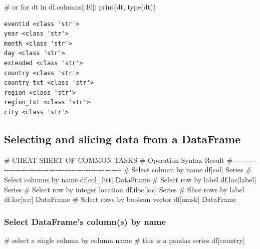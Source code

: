 \documentclass[
  letterpaper,
  DIV=11,
  numbers=noendperiod]{scrreprt}
\newenvironment{Shaded}{\begin{snugshade}}{\end{snugshade}}
\newcommand{\BuiltInTok}[1]{\textcolor[rgb]{0.00,0.23,0.31}{#1}}
\newcommand{\CommentTok}[1]{\textcolor[rgb]{0.37,0.37,0.37}{#1}}
\newcommand{\ControlFlowTok}[1]{\textcolor[rgb]{0.00,0.23,0.31}{#1}}
\newcommand{\DecValTok}[1]{\textcolor[rgb]{0.68,0.00,0.00}{#1}}
\newcommand{\KeywordTok}[1]{\textcolor[rgb]{0.00,0.23,0.31}{#1}}
\newcommand{\NormalTok}[1]{\textcolor[rgb]{0.00,0.23,0.31}{#1}}
\newcommand{\StringTok}[1]{\textcolor[rgb]{0.13,0.47,0.30}{#1}}
\begin{document}
\begin{Shaded}
\begin{Highlighting}[]
\CommentTok{\# or}
\ControlFlowTok{for}\NormalTok{ dt }\KeywordTok{in}\NormalTok{ df.columns[:}\DecValTok{10}\NormalTok{]:}
    \BuiltInTok{print}\NormalTok{(dt, }\BuiltInTok{type}\NormalTok{(dt))}
\end{Highlighting}
\end{Shaded}

\begin{verbatim}
eventid <class 'str'>
year <class 'str'>
month <class 'str'>
day <class 'str'>
extended <class 'str'>
country <class 'str'>
country_txt <class 'str'>
region <class 'str'>
region_txt <class 'str'>
city <class 'str'>
\end{verbatim}

\subsection{Selecting and slicing data from a
DataFrame}\label{selecting-and-slicing-data-from-a-dataframe}

\begin{Shaded}
\begin{Highlighting}[]
\CommentTok{\# CHEAT SHEET OF COMMON TASKS}
\CommentTok{\# Operation                       Syntax           Result}
\CommentTok{\#{-}{-}{-}{-}{-}{-}{-}{-}{-}{-}{-}{-}{-}{-}{-}{-}{-}{-}{-}{-}{-}{-}{-}{-}{-}{-}{-}{-}{-}{-}{-}{-}{-}{-}{-}{-}{-}{-}{-}{-}{-}{-}{-}{-}{-}{-}{-}{-}{-}{-}{-}{-}{-}{-}{-}{-}{-}{-}{-}{-}}
\CommentTok{\# Select column by name           df[col]          Series}
\CommentTok{\# Select columns by name          df[col\_list]     DataFrame}
\CommentTok{\# Select row by label             df.loc[label]    Series}
\CommentTok{\# Select row by integer location  df.iloc[loc]     Series}
\CommentTok{\# Slice rows by label             df.loc[a:c]      DataFrame}
\CommentTok{\# Select rows by boolean vector   df[mask]         DataFrame}
\end{Highlighting}
\end{Shaded}

\subsubsection{Select DataFrame's column(s) by
name}\label{select-dataframes-columns-by-name}

\begin{Shaded}
\begin{Highlighting}[]
\CommentTok{\# select a single column by column name}
\CommentTok{\# this is a pandas series}
\NormalTok{df[}\StringTok{\textquotesingle{}country\textquotesingle{}}\NormalTok{]}
\end{Highlighting}
\end{Shaded}
\end{document}
